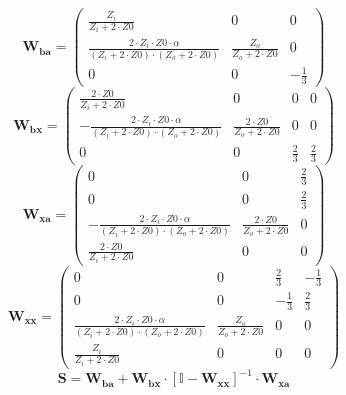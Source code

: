 \[ \mathbf{W_{ba}} = \left(\begin{smallmatrix} \frac{Z_i}{Z_i+2\cdot
Z0} & 0 & 0 \\ \frac{2\cdot Z_i\cdot Z0\cdot \alpha}{\left(Z_i+2\cdot
Z0\right)\cdot\left(Z_o+2\cdot Z0\right)} & \frac{Z_o}{Z_o+2\cdot Z0}
& 0 \\ 0 & 0 & -\frac{1}{3} \end{smallmatrix}\right) \]
\[ \mathbf{W_{bx}} = \left(\begin{smallmatrix} \frac{2\cdot
Z0}{Z_i+2\cdot Z0} & 0 & 0 & 0 \\ -\frac{2\cdot Z_i\cdot Z0\cdot
\alpha}{\left(Z_i+2\cdot Z0\right)\cdot\left(Z_o+2\cdot Z0\right)} &
\frac{2\cdot Z0}{Z_o+2\cdot Z0} & 0 & 0 \\ 0 & 0 & \frac{2}{3} &
\frac{2}{3} \end{smallmatrix}\right) \]
\[ \mathbf{W_{xa}} = \left(\begin{smallmatrix} 0 & 0 & \frac{2}{3} \\
0 & 0 & \frac{2}{3} \\ -\frac{2\cdot Z_i\cdot Z0\cdot
\alpha}{\left(Z_i+2\cdot Z0\right)\cdot\left(Z_o+2\cdot Z0\right)} &
\frac{2\cdot Z0}{Z_o+2\cdot Z0} & 0 \\ \frac{2\cdot Z0}{Z_i+2\cdot Z0}
& 0 & 0 \end{smallmatrix}\right) \]
\[ \mathbf{W_{xx}} = \left(\begin{smallmatrix} 0 & 0 & \frac{2}{3} &
-\frac{1}{3} \\ 0 & 0 & -\frac{1}{3} & \frac{2}{3} \\ \frac{2\cdot
Z_i\cdot Z0\cdot \alpha}{\left(Z_i+2\cdot
Z0\right)\cdot\left(Z_o+2\cdot Z0\right)} & \frac{Z_o}{Z_o+2\cdot Z0}
& 0 & 0 \\ \frac{Z_i}{Z_i+2\cdot Z0} & 0 & 0 & 0
\end{smallmatrix}\right) \]
\[ \mathbf{S}=\mathbf{W_{ba}}+\mathbf{W_{bx}}\cdot\left[ \mathbb{I}
-\mathbf{W_{xx}}\right]^{-1}\cdot\mathbf{W_{xa}} \]
